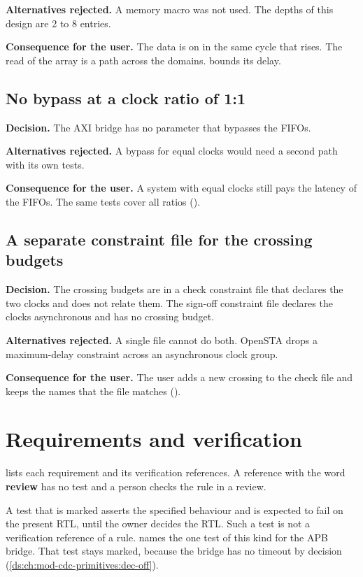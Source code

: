 \textbf{Alternatives rejected.} A memory macro was not used. The depths of this design are 2 to 8 entries.

\textbf{Consequence for the user.} The data is on  in the same cycle that  rises. The read of the array is a path across the domains.  bounds its delay.

\subsection{No bypass at a clock ratio of 1:1}\label{ds:ch:mod-cdc-primitives:dec-bypass}
\textbf{Decision.} The AXI bridge has no parameter that bypasses the FIFOs.

\textbf{Alternatives rejected.} A bypass for equal clocks would need a second path with its own tests.

\textbf{Consequence for the user.} A system with equal clocks still pays the latency of the FIFOs. The same tests cover all ratios ().

\subsection{A separate constraint file for the crossing budgets}\label{ds:ch:mod-cdc-primitives:dec-sdc}
\textbf{Decision.} The crossing budgets are in a check constraint file that declares the two clocks and does not relate them. The sign-off constraint file declares the clocks asynchronous and has no crossing budget.

\textbf{Alternatives rejected.} A single file cannot do both. OpenSTA drops a maximum-delay constraint across an asynchronous clock group.

\textbf{Consequence for the user.} The user adds a new crossing to the check file and keeps the names that the file matches ().

\section{Requirements and verification}\label{ds:ch:mod-cdc-primitives:map}
 lists each requirement and its verification references. A reference with the word \textbf{review} has no test and a person checks the rule in a review.

A test that is marked  asserts the specified behaviour and is expected to fail on the present RTL, until the owner decides the RTL. Such a test is not a verification reference of a rule.  names the one test of this kind for the APB bridge. That test stays marked, because the bridge has no timeout by decision (\cref{ds:ch:mod-cdc-primitives:dec-off}).


